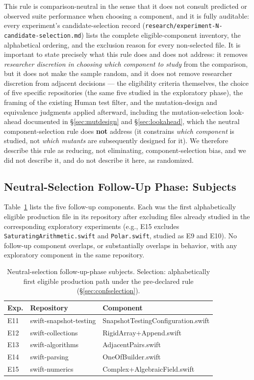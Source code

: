 \documentclass[10pt,conference]{IEEEtran}
\begin{document}
This rule is comparison-neutral in the sense that it does not consult predicted or observed suite performance when choosing a component, and it is fully auditable: every experiment's candidate-selection record (\texttt{research/experiment-N-candidate-selection.md}) lists the complete eligible-component inventory, the alphabetical ordering, and the exclusion reason for every non-selected file. It is important to state precisely what this rule does and does not address: it removes \emph{researcher discretion in choosing which component to study} from the comparison, but it does not make the sample random, and it does not remove researcher discretion from adjacent decisions — the eligibility criteria themselves, the choice of five specific repositories (the same five studied in the exploratory phase), the framing of the existing Human test filter, and the mutation-design and equivalence judgments applied afterward, including the mutation-selection look-ahead documented in \S\ref{sec:mutdesign} and \S\ref{sec:lookahead}, which the neutral component-selection rule does \textbf{not} address (it constrains \emph{which component} is studied, not \emph{which mutants} are subsequently designed for it). We therefore describe this rule as reducing, not eliminating, component-selection bias, and we did not describe it, and do not describe it here, as randomized.

\subsection{Neutral-Selection Follow-Up Phase: Subjects}
\label{sec:confsubjects}
Table~\ref{tab:subjects2} lists the five follow-up components. Each was the first alphabetically eligible production file in its repository after excluding files already studied in the corresponding exploratory experiments (e.g., E15 excludes \texttt{SaturatingArithmetic.swift} and \texttt{Polar.swift}, studied as E9 and E10). No follow-up component overlaps, or substantially overlaps in behavior, with any exploratory component in the same repository.

\begin{table}[ht]
\centering
\caption{Neutral-selection follow-up-phase subjects. Selection: alphabetically first eligible production path under the pre-declared rule (\S\ref{sec:confselection}).}
\label{tab:subjects2}
\small
\begin{tabular}{lll}
\toprule
Exp. & Repository & Component \\
\midrule
E11 & swift-snapshot-testing & SnapshotTestingConfiguration.swift \\
E12 & swift-collections & RigidArray+Append.swift \\
E13 & swift-algorithms & AdjacentPairs.swift \\
E14 & swift-parsing & OneOfBuilder.swift \\
E15 & swift-numerics & Complex+AlgebraicField.swift \\
\bottomrule
\end{tabular}
\end{table}
\end{document}
